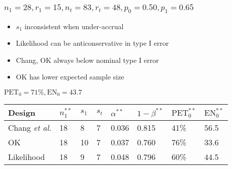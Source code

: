 \documentclass{beamer}\usepackage[]{graphicx}\usepackage[]{color}
\begin{document}
\begin{frame}
\frametitle{$n_1=28, r_1=15, n_t=83, r_t=48, p_0 = 0.50, p_1 = 0.65$}
    \begin{itemize}
        \item $s_1$ inconsistent when under-accrual %
        \item Likelihood can be anticonservative in type I error
        \item Chang, OK always below nominal type I error %
        \item OK has lower expected sample size %
    \end{itemize}

$\mbox{PET}_0 = 71\%, \mbox{EN}_0 = 43.7$
\begin{table}[]
\begin{tabular}{llllllll}
Design                  & $n_1^{\ast\ast}$ & $s_1$ & $s_t$ & $\alpha^{\ast\ast}$ & $1-\beta^{\ast\ast}$ & $\mbox{PET}^{\ast\ast}_0$ & $\mbox{EN}^{\ast\ast}_0$ \\ \hline
Chang \textit{et al.}   & 18               & 8     & 7     & 0.036                                 & 0.815                & 41\%                      & 56.5                     \\
OK                      & 18               & 10     & 7     & 0.037                                 & 0.760                & 76\%                      & 33.6                     \\
Likelihood              & 18               & 9     & 7     & 0.048                                 & 0.796                & 60\%                      & 44.5                    
\end{tabular}
\end{table}

\end{frame}
\end{document}
